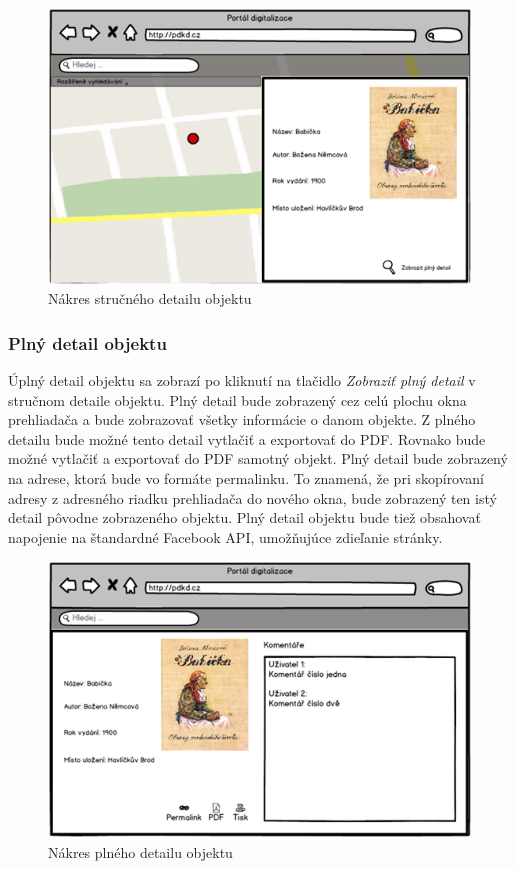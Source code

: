 \documentclass[
  print, %
  table,   %
  lof,     %
  nolot,     %
]{fithesis3}
\begin{document}
\begin{figure}[H]
	\centering
	\includegraphics[width=\textwidth]{fithesis/mockup/detail-small.png}	
	\caption{Nákres stručného detailu objektu}
	\label{mockup-detail-small}
\end{figure}
\clearpage
\subsubsection{Plný detail objektu}
Úplný detail objektu sa zobrazí po kliknutí na tlačidlo \textit{Zobraziť plný detail} v stručnom detaile objektu. Plný detail bude zobrazený cez celú plochu okna prehliadača a bude zobrazovať všetky informácie o danom objekte.
Z plného detailu bude možné tento detail vytlačiť a exportovať do PDF. Rovnako bude možné vytlačiť a exportovať do PDF samotný objekt. Plný detail bude zobrazený na adrese, ktorá bude vo formáte permalinku. To znamená, že pri skopírovaní adresy z adresného riadku prehliadača do nového okna, bude zobrazený ten istý detail pôvodne zobrazeného objektu. Plný detail objektu bude tiež obsahovať napojenie na štandardné Facebook API, umožňujúce zdieľanie stránky.
\begin{figure}[H]
	\centering
	\includegraphics[width=\textwidth]{fithesis/mockup/detail-full.png}	
	\caption{Nákres plného detailu objektu}
	\label{mockup-detail-full}
\end{figure}
\clearpage
\end{document}

